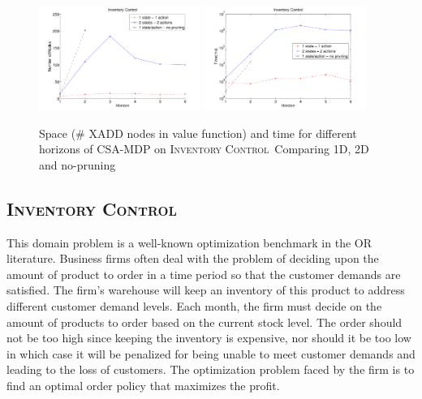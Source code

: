 \documentclass[letterpaper]{article}
\newcommand{\InventoryControl}{\textsc{Inventory Control}}
\begin{document}
\begin{figure}[t]
\centering
\includegraphics[width=0.47\textwidth]{Figures1/space1-3.pdf}
\hspace{5mm}
\includegraphics[width=0.47\textwidth]{Figures1/time1-3.pdf}
\caption{\footnotesize
Space (\# XADD nodes in value function) and
time for different horizons of CSA-MDP on \InventoryControl\
Comparing 1D, 2D and no-pruning}
\label{fig:invC}
\end{figure}
 
\subsection{\InventoryControl}
This domain problem is a well-known optimization benchmark in the OR
literature. Business firms often deal with the problem of deciding upon the
amount of product to order in a time period so that the customer demands are
satisfied. The firm's warehouse will keep an inventory of this product to
address different customer demand levels. Each month, the firm must decide
on the amount of products to order based on the current stock level.
The order should not be too high since keeping the inventory is expensive,
nor should it be too low in which case it will be penalized for being unable
to meet customer demands and leading to the loss of customers. The
optimization problem faced by the firm is to find an optimal order policy
that maximizes the profit.~\cite{Mahootchi2009}
 
\end{document}
